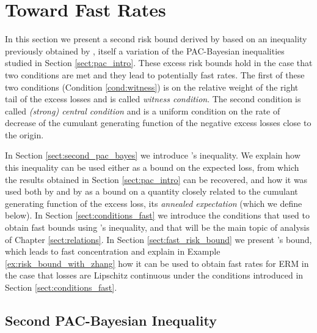 \documentclass{uvamath}
\theoremstyle{remark}
\theoremstyle{definition}
\theoremstyle{definition}
\theoremstyle{definition}
\theoremstyle{definition}
\theoremstyle{definition}
\begin{document}
\chapter{Toward Fast Rates \label{sect:pac_fast_rates}}

In this section we present a second risk bound derived by
\citet{grunwald_fast_2016} based on an inequality previously obtained
by \citet{zhang_information-theoretic_2006}, itself a variation of the
PAC-Bayesian inequalities studied in Section
\ref{sect:pac_intro}. These excess risk bounds hold in the case that
two conditions are met and they lead to potentially fast rates. The
first of these two conditions (Condition \ref{cond:witness}) is on the
relative weight of the right tail of the excess losses and is called
\textit{witness condition}. The second condition is called
\textit{(strong) central condition} and is a uniform condition on the
rate of decrease of the cumulant generating function of the negative
excess losses close to the origin.

In Section \ref{sect:second_pac_bayes} we introduce
\citeauthor{zhang_information-theoretic_2006}'s inequality. We explain
how this inequality can be used either as a bound on the expected
loss, from which the results obtained in Section \ref{sect:pac_intro}
can be recovered, and how it was used both by
\citeauthor{zhang_information-theoretic_2006} and by
\citeauthor{grunwald_fast_2016} as a bound on a quantity closely
related to the cumulant generating function of the excess loss, its
\textit{annealed expectation} (which we define below). In Section
\ref{sect:conditions_fast} we introduce the conditions that
\citeauthor{grunwald_fast_2016} used to obtain fast bounds using
\citeauthor{zhang_information-theoretic_2006}'s inequality, and that
will be the main topic of analysis of Chapter \ref{sect:relations}. In
Section \ref{sect:fast_risk_bound} we present
\citeauthor{grunwald_fast_2016}'s bound, which leads to fast
concentration and explain in Example \ref{ex:risk_bound_with_zhang}
how it can be used to obtain fast rates for ERM in the case that
losses are Lipschitz continuous under the conditions introduced in
Section \ref{sect:conditions_fast}.

\section{Second PAC-Bayesian Inequality \label{sect:second_pac_bayes}}
\end{document}

